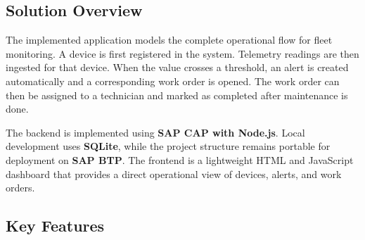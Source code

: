 \documentclass[a4paper,12pt]{article}
\begin{document}
\subsection{Solution Overview}

The implemented application models the complete operational flow for fleet monitoring. A device is first registered in the system. Telemetry readings are then ingested for that device. When the value crosses a threshold, an alert is created automatically and a corresponding work order is opened. The work order can then be assigned to a technician and marked as completed after maintenance is done.

The backend is implemented using \textbf{SAP CAP with Node.js}. Local development uses \textbf{SQLite}, while the project structure remains portable for deployment on \textbf{SAP BTP}. The frontend is a lightweight HTML and JavaScript dashboard that provides a direct operational view of devices, alerts, and work orders.

\subsection{Key Features}
\end{document}

